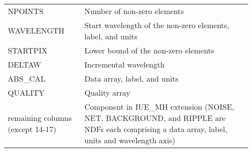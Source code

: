 \documentclass[twoside,11pt]{article}
\begin{document}
{{{{            \\[\medskipamount]
            \begin{tabular}{p{32mm}p{90mm}}
            NPOINTS            &   Number of non-zero elements \\
            WAVELENGTH         &   Start wavelength of the non-zero
                                   elements, label, and units \\
            STARTPIX           &   Lower bound of the non-zero elements \\
            DELTAW             &   Incremental wavelength \\
            ABS\_CAL           &   Data array, label, and units \\
            QUALITY            &   Quality array \\
            remaining columns (except 14-17) &   Component in IUE\_MH extension
                                   (NOISE, NET, BACKGROUND, and RIPPLE are NDFs
                                   each comprising a data array, label,
                                   units and wavelength axis) \\
            \end{tabular}

}}}}
\end{document}
